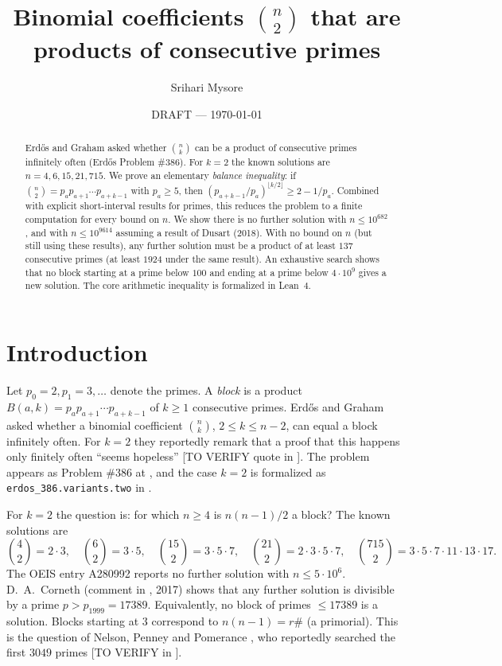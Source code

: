 \documentclass[11pt]{article}
\title{Binomial coefficients $\binom{n}{2}$ that are products of consecutive primes}
\author{Srihari Mysore}
\date{DRAFT --- \today}
\theoremstyle{remark}
\newcommand{\binomtwo}[1]{\binom{#1}{2}}
\begin{document}
\maketitle

\begin{abstract}
Erd\H{o}s and Graham asked whether $\binom{n}{k}$ can be a product of consecutive primes
infinitely often (Erd\H{o}s Problem \#386). For $k=2$ the known solutions are
$n = 4, 6, 15, 21, 715$. We prove an elementary \emph{balance inequality}: if
$\binom{n}{2} = p_a p_{a+1}\cdots p_{a+k-1}$ with $p_a \ge 5$, then
$(p_{a+k-1}/p_a)^{\lfloor k/2\rfloor} \ge 2 - 1/p_a$. Combined with explicit
short-interval results for primes, this reduces the problem to a finite computation for
every bound on $n$. We show there is no further solution with $n \le 10^{682}$, and with
$n \le 10^{9614}$ assuming a result of Dusart (2018). With no bound on $n$ (but still using these results), any further
solution must be a product of at least $137$ consecutive primes (at least $1924$ under the
same result). An exhaustive search shows that no block starting at a prime below $100$ and
ending at a prime below $4\cdot 10^9$ gives a new solution. The core arithmetic inequality
is formalized in Lean~4.
\end{abstract}

\section{Introduction}

Let $p_0 = 2, p_1 = 3, \dots$ denote the primes. A \emph{block} is a product
$B(a,k) = p_a p_{a+1} \cdots p_{a+k-1}$ of $k \ge 1$ consecutive primes. Erd\H{o}s and
Graham \cite{EG} asked whether a binomial coefficient $\binom{n}{k}$, $2 \le k \le n-2$, can
equal a block infinitely often. For $k=2$ they reportedly remark that a proof that this happens only
finitely often ``seems hopeless'' [TO VERIFY quote in \cite{EG}]. The problem appears as Problem \#386 at
\cite{EP}, and the case $k = 2$ is formalized as \texttt{erdos\_386.variants.two} in
\cite{FC}.

For $k=2$ the question is: for which $n \ge 4$ is $n(n-1)/2$ a block? The known solutions
are
\[
\binomtwo{4} = 2\cdot 3,\quad \binomtwo{6} = 3\cdot 5,\quad \binomtwo{15} = 3\cdot5\cdot7,\quad
\binomtwo{21} = 2\cdot3\cdot5\cdot7,\quad \binomtwo{715} = 3\cdot5\cdot7\cdot11\cdot13\cdot17.
\]
The OEIS entry A280992 \cite{OEIS} reports no further solution with $n \le 5\cdot10^6$.
D.~A.~Corneth (comment in \cite{OEIS}, 2017) shows that any further solution is divisible by a
prime $p > p_{1999} = 17389$. Equivalently, no block of primes $\le 17389$ is a solution.
Blocks starting at $3$ correspond to $n(n-1) = r\#$ (a primorial). This is the question of
Nelson, Penney and Pomerance \cite{NPP}, who reportedly searched the first $3049$ primes
[TO VERIFY in \cite{NPP}].
\end{document}
